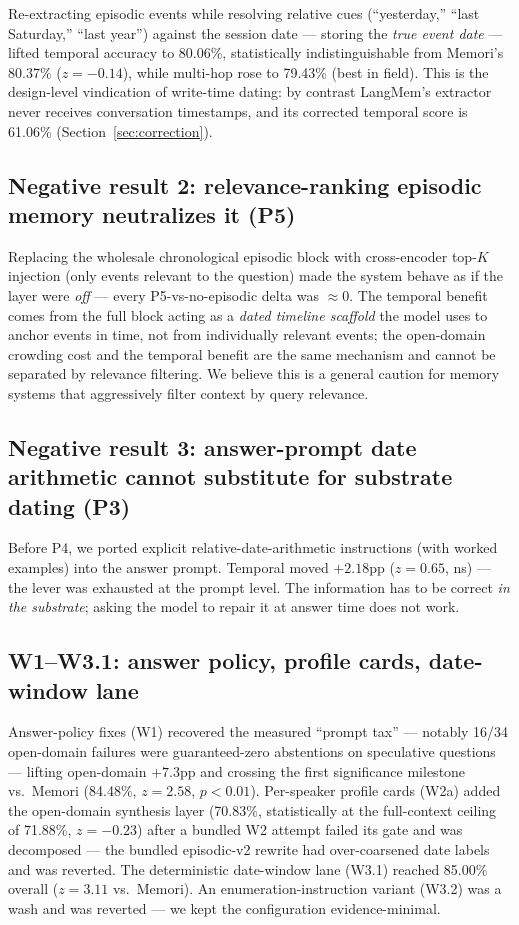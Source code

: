 \documentclass[11pt]{article}
\begin{document}
Re-extracting episodic events while resolving relative cues
(``yesterday,'' ``last Saturday,'' ``last year'') against the session
date --- storing the \emph{true event date} --- lifted temporal
accuracy to 80.06\%, statistically indistinguishable from Memori's
80.37\% ($z{=}{-}0.14$), while multi-hop rose to 79.43\% (best in
field). This is the design-level vindication of write-time dating: by
contrast LangMem's extractor never receives conversation timestamps,
and its corrected temporal score is 61.06\% (Section~\ref{sec:correction}).

\subsection{Negative result 2: relevance-ranking episodic memory
neutralizes it (P5)}

Replacing the wholesale chronological episodic block with
cross-encoder top-$K$ injection (only events relevant to the question)
made the system behave as if the layer were \emph{off} --- every
P5-vs-no-episodic delta was ${\approx}0$. The temporal benefit comes
from the full block acting as a \emph{dated timeline scaffold} the
model uses to anchor events in time, not from individually relevant
events; the open-domain crowding cost and the temporal benefit are the
same mechanism and cannot be separated by relevance filtering. We
believe this is a general caution for memory systems that aggressively
filter context by query relevance.

\subsection{Negative result 3: answer-prompt date arithmetic cannot
substitute for substrate dating (P3)}

Before P4, we ported explicit relative-date-arithmetic instructions
(with worked examples) into the answer prompt. Temporal moved
$+2.18$pp ($z{=}0.65$, ns) --- the lever was exhausted at the prompt
level. The information has to be correct \emph{in the substrate};
asking the model to repair it at answer time does not work.

\subsection{W1--W3.1: answer policy, profile cards, date-window lane}

Answer-policy fixes (W1) recovered the measured ``prompt tax'' ---
notably 16/34 open-domain failures were guaranteed-zero abstentions on
speculative questions --- lifting open-domain $+7.3$pp and crossing
the first significance milestone vs.\ Memori (84.48\%, $z{=}2.58$,
$p{<}0.01$). Per-speaker profile cards (W2a) added the open-domain
synthesis layer (70.83\%, statistically at the full-context ceiling of
71.88\%, $z{=}{-}0.23$) after a bundled W2 attempt failed its gate and
was decomposed --- the bundled episodic-v2 rewrite had over-coarsened
date labels and was reverted. The deterministic date-window lane
(W3.1) reached 85.00\% overall ($z{=}3.11$ vs.\ Memori). An
enumeration-instruction variant (W3.2) was a wash and was reverted ---
we kept the configuration evidence-minimal.
\end{document}
